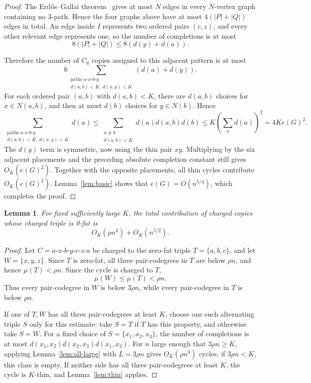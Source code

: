 \documentclass[11pt,letterpaper]{article}
\newtheorem{lemma}[theorem]{Lemma}
\begin{document}
\begin{proof}
The Erd\H{o}s--Gallai theorem~\cite{ErdosGallai} gives at most \(N\)
edges in every \(N\)-vertex graph containing no 3-path. Hence the four graphs above have
at most \(4(|P|+|Q|)\) edges in total. An edge inside \(I\) represents two ordered pairs
\((c,z)\), and every other relevant edge represents one, so the number of completions is at most
\[
  8(|P|+|Q|)\le8(d(y)+d(a)).
\]

Therefore the number of \(C_6\) copies assigned to this adjacent pattern is at most
\[
  8\sum_{\substack{\text{paths }a\text{-}x\text{-}b\text{-}y\\ d(a,b)<K,\ d(x,y)<K}}
  (d(a)+d(y)).
\]
For each ordered pair \((a,b)\) with
\(d(a,b)<K\), there are \(d(a,b)\) choices for \(x\in N(a,b)\), and then at most \(d(b)\) choices
for \(y\in N(b)\). Hence
\[
  \sum_{\substack{\text{paths }a\text{-}x\text{-}b\text{-}y\\ d(a,b)<K,\ d(x,y)<K}}d(a)
  \le\sum_{\substack{a\ne b\\d(a,b)<K}}d(a)d(a,b)d(b)
  \le K\left(\sum_ad(a)\right)^2
  =4Ke(G)^2.
\]
The \(d(y)\) term is symmetric, now using the thin pair \(xy\). Multiplying by the six adjacent
placements and the preceding absolute completion constant still gives \(O_K(e(G)^2)\). Together
with the opposite placements, all thin cycles contribute \(O_K(e(G)^2)\). 
Lemma~\ref{lem:basic} shows that $e(G)=O(n^{5/4})$, which completes the proof.
\end{proof}

\begin{lemma}\label{lem:zero-fat}
For fixed sufficiently large \(K\), the total contribution of charged copies whose charged triple is 0-fat is
\[
  O_K(\rho n^3)+O_K(n^{5/2}).
\]
\end{lemma}

\begin{proof}
Let $C=a$-$x$-$b$-$y$-$c$-$z$-$a$ be charged to the zero-fat triple \(T=\{a,b,c\}\), and let \(W=\{x,y,z\}\). Since
\(T\) is zero-fat, all three pair-codegrees in \(T\) are below \(\rho n\), and hence
\(\mu(T)<\rho n\). Since the cycle is charged to \(T\),
\[
  \mu(W)\le\mu(T)<\rho n.
\]
Thus every pair-codegree in \(W\) is below \(3\rho n\), while every pair-codegree in \(T\) is
below \(\rho n\). %

If one of \(T,W\) has all three pair-codegrees at least \(K\), choose one such alternating triple
\(S\) only for this estimate: take \(S=T\) if \(T\) has this property, and otherwise take \(S=W\). For a fixed choice of
\(S=\{x_1,x_2,x_3\}\), the number of completions is at most $d(x_1,x_2)d(x_2,x_3)d(x_1,x_3)$. For
\(n\) large enough that \(3\rho n\ge K\), applying
Lemma~\ref{lem:all-large} with \(L=3\rho n\) gives \(O_K(\rho n^3)\) cycles; if
\(3\rho n<K\), this class is empty. If neither side has all three pair-codegrees at least \(K\), the cycle is \(K\)-thin, and
Lemma~\ref{lem:thin} applies.
\end{proof}
\end{document}

